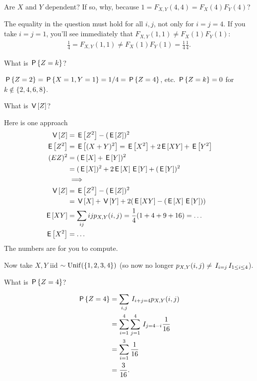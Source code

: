 \begin{exercise}
Are $X$ and $Y$ dependent?  If so, why, because $1=F_{X,Y}(4,4)= F_X(4)F_Y(4)$?
\begin{solution}
  The equality in the question must hold for all $i,j$, not only for $i=j=4$.
  If you take $i=j=1$, you'll see immediately that $F_{X,Y}(1,1)\neq F_X(1)F_Y(1)$:
  \begin{align}
    \label{eq:23}
    \frac{1}{4} = F_{X,Y}(1,1) \neq F_{X}(1) F_Y(1) = \frac{1}{4}\frac{1}{4}.
  \end{align}
\end{solution}
\end{exercise}

\begin{exercise}
What is $\P{Z=k}$?
\begin{solution}
$\P{Z=2} = \P{X=1, Y=1} = 1/4 = \P{Z=4}$, etc.
$\P{Z=k} = 0$ for $k\not \in \{2, 4, 6, 8\}$.
\end{solution}
\end{exercise}


\begin{exercise}
What is $\V Z$?
\begin{solution}
Here is one approach
\begin{align}
\label{eq:3}
\V Z &= \E{Z^2} - (\E Z)^{2}\\
\E{Z^2} &= \E{(X+Y)^{2}} = \E{X^{2}} + 2\E{XY} + \E{Y^{2}} \\
(E{Z})^{2} &= (\E X + \E Y)^{2} \\
 &= (\E X)^2 + 2\E X \E Y + (\E Y)^{2} \\
&\implies \\
\V Z &= \E{Z^2} - (\E Z)^{2}\\
 &= \V X + \V Y + 2 (\E{XY} - (\E X \E Y))\\
\E{XY} &= \sum_{ij} ijp_{X,Y}(i,j) = \frac 1 4 (1 + 4 + 9 + 16) = \ldots \\
\E{X^{2}} &= \ldots
\end{align}
The numbers are for you to compute.
\end{solution}
\end{exercise}


Now take $X, Y$ iid $\sim\Unif{\{1,2,3,4\}}$ (so now no longer $p_{X,Y}(i,j) \neq \1{i=j}\1{1\leq i \leq 4}$).

\begin{exercise}
What is $\P{Z=4}$?
\begin{solution}
\begin{align}
\label{eq:2}
\P{Z=4}
&= \sum_{i, j} \1{i+j=4} p_{X,Y}(i,j) \\
&= \sum_{i=1}^4 \sum_{j=1}^{4} \1{j=4-i} \frac{1}{16} \\
&= \sum_{i=1}^3  \frac{1}{16} \\
&= \frac{3}{16}.
\end{align}
\end{solution}
\end{exercise}

